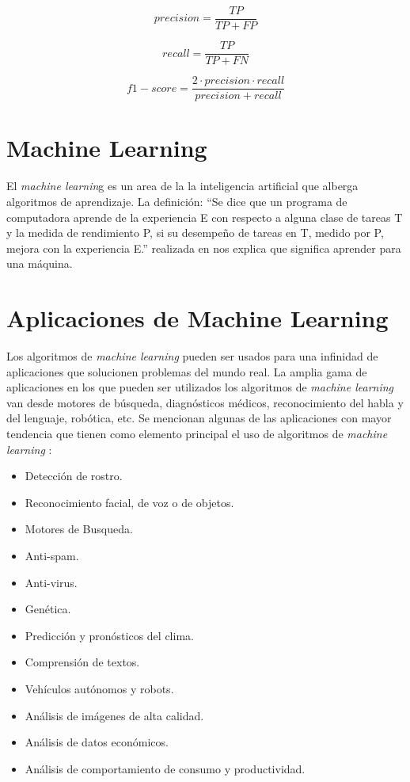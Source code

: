 \begin{equation}\label{eq:Aprecision}
precision = \frac{ TP}{TP+FP}
\end{equation}

\begin{equation}\label{eq:Arecall}
recall = \frac{ TP}{TP+FN}
\end{equation}

\begin{equation}\label{eq:Af1score}
f1-score = \frac{2 \cdot precision\cdot recall}{precision+ recall}
\end{equation}



\section{Machine Learning}

El \textit{machine learnin}g es un area de la la inteligencia artificial que alberga algoritmos de aprendizaje. La definición: “Se dice que un programa de computadora aprende de la experiencia E con respecto a alguna clase de tareas T y la medida de rendimiento P, si su desempeño de tareas en T, medido por P, mejora con la experiencia E.” realizada en \cite{mitchell1997machine} nos explica que significa aprender para una máquina.
 
\section{Aplicaciones de Machine Learning}

Los algoritmos de \textit{machine learning} 
pueden ser usados para una infinidad de aplicaciones que solucionen problemas del mundo real. La amplia gama de aplicaciones en los que pueden ser utilizados los algoritmos de \textit{machine learning} van desde motores de búsqueda, diagnósticos médicos, reconocimiento del habla y del lenguaje, robótica, etc.
Se mencionan algunas de las aplicaciones con mayor tendencia que tienen como elemento principal el uso de algoritmos de \textit{machine learning} \cite{31MLApplications}:


 


\begin{itemize}
\item Detección de rostro.
\item Reconocimiento facial, de voz o de objetos.
\item Motores de Busqueda.
\item Anti-spam.
\item Anti-virus.
\item Genética.
\item Predicción y pronósticos del clima.
\item Comprensión de textos.
\item Vehículos autónomos y robots.
\item Análisis de imágenes de alta calidad.
\item Análisis de datos económicos.
\item Análisis de comportamiento de consumo y productividad.

\end{itemize}


